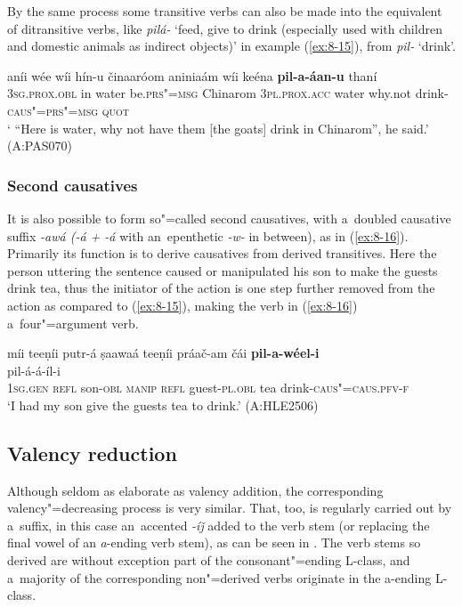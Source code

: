 By the same process some transitive verbs can also be made into the equivalent of ditransitive verbs, like \textit{pilá-} `feed, give to drink (especially used with children and domestic animals as indirect objects)' in example (\ref{ex:8-15}), from \textit{pil-} `drink'. 

\begin{exe}
\ex
\label{ex:8-15}
\gll aníi wée wíi hín-u činaaróom aniniaám wíi keéna \textbf{pil-a-áan-u} thaní  \\
\textsc{3sg.prox.obl} in water be.\textsc{prs"=msg} Chinarom \textsc{3pl.prox.acc} water why.not drink-\textsc{caus"=prs"=msg} \textsc{quot} \\
\glt ` ``Here is water, why not have them [the goats] drink in Chinarom'', he said.' (A:PAS070)
\end{exe}

\subsubsection*{Second causatives}

It is also possible to form so"=called second causatives, with a~doubled causative suffix \textit{-awá (-á + -á} with an~epenthetic \textit{-w-} in between), as in (\ref{ex:8-16}). Primarily its function is to derive causatives from derived transitives. Here the person uttering the sentence caused or manipulated his son to make the guests drink tea, thus the initiator of the action is one step further removed from the action as compared to (\ref{ex:8-15}), making the verb in (\ref{ex:8-16}) a~four"=argument verb. 


\ea
\label{ex:8-16}
\glll míi teeṇíi putr-á ṣaawaá teeṇíi práač-am čái \textbf{pil-a-wéel-i}\\
	{} {} {} {} {} {} {}  pil-á-á-íl-i\\
\textsc{1sg.gen} \textsc{refl} son-\textsc{obl} \textsc{manip} \textsc{refl} guest-\textsc{pl.obl} tea drink-\textsc{caus"=caus.pfv-f}\\
\glt `I had my son give the guests tea to drink.' (A:HLE2506)
\z


\subsection{Valency reduction}
\label{subsec:8-5-2}

Although seldom as elaborate as valency addition, the corresponding valency"=decreasing process is very similar. That, too, is regularly carried out by a~suffix, in this case an~accented \textit{-íǰ} added to the verb stem (or replacing the final vowel of an \textit{a}-ending verb stem), as can be seen in . The verb stems so derived are without exception part of the consonant"=ending L-class, and a~majority of the corresponding non"=derived verbs originate in the a-ending L-class.


